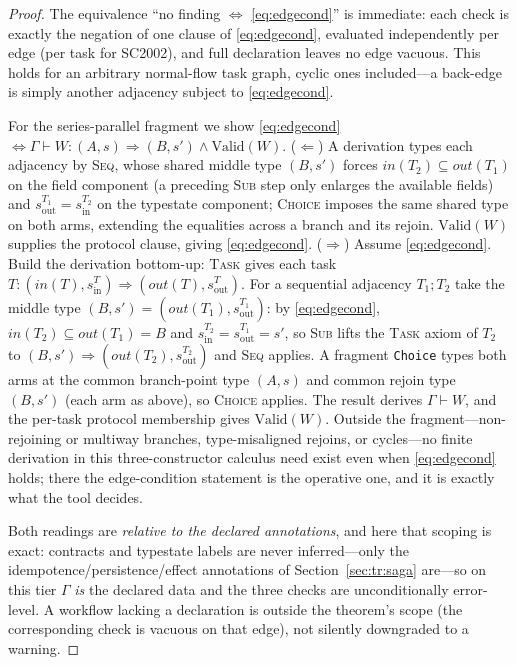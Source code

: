 \documentclass[11pt]{article}
\newcommand{\code}[1]{\textsf{\small #1}}
\theoremstyle{plain}
\theoremstyle{definition}
\theoremstyle{remark}
\begin{document}
\begin{proof}
The equivalence ``no finding $\iff$ \eqref{eq:edgecond}'' is immediate: each check is exactly the
negation of one clause of \eqref{eq:edgecond}, evaluated independently per edge (per task for
\code{SC2002}), and full declaration leaves no edge vacuous. This holds for an arbitrary
normal-flow task graph, cyclic ones included---a back-edge is simply another adjacency subject to
\eqref{eq:edgecond}.

For the series-parallel fragment we show \eqref{eq:edgecond}$\iff\Gamma\vdash
W:(A,s)\Rightarrow(B,s')\wedge\mathrm{Valid}(W)$. ($\Leftarrow$) A derivation types each adjacency
by \textsc{Seq}, whose shared middle type $(B,s')$ forces $\mathit{in}(T_2)\subseteq\mathit{out}(T_1)$
on the field component (a preceding \textsc{Sub} step only enlarges the available fields) and
$s_{\mathrm{out}}^{T_1}=s_{\mathrm{in}}^{T_2}$ on the typestate component; \textsc{Choice} imposes
the same shared type on both arms, extending the equalities across a branch and its rejoin.
$\mathrm{Valid}(W)$ supplies the protocol clause, giving \eqref{eq:edgecond}. ($\Rightarrow$)
Assume \eqref{eq:edgecond}. Build the derivation bottom-up: \textsc{Task} gives each task
$T:(\mathit{in}(T),s_{\mathrm{in}}^T)\Rightarrow(\mathit{out}(T),s_{\mathrm{out}}^T)$. For a
sequential adjacency $T_1;T_2$ take the middle type
$(B,s')=(\mathit{out}(T_1),s_{\mathrm{out}}^{T_1})$: by \eqref{eq:edgecond},
$\mathit{in}(T_2)\subseteq\mathit{out}(T_1)=B$ and $s_{\mathrm{in}}^{T_2}=s_{\mathrm{out}}^{T_1}=s'$,
so \textsc{Sub} lifts the \textsc{Task} axiom of $T_2$ to $(B,s')\Rightarrow(\mathit{out}(T_2),
s_{\mathrm{out}}^{T_2})$ and \textsc{Seq} applies. A fragment \texttt{Choice} types both arms at
the common branch-point type $(A,s)$ and common rejoin type $(B,s')$ (each arm as above), so
\textsc{Choice} applies. The result derives $\Gamma\vdash W$, and the per-task protocol
membership gives $\mathrm{Valid}(W)$. Outside the fragment---non-rejoining or multiway branches,
type-misaligned rejoins, or cycles---no finite derivation in this three-constructor calculus need
exist even when \eqref{eq:edgecond} holds; there the edge-condition statement is the operative
one, and it is exactly what the tool decides.

Both readings are \emph{relative to the declared annotations}, and here that scoping is exact:
contracts and typestate labels are never inferred---only the idempotence/persistence/effect
annotations of Section~\ref{sec:tr:saga} are---so on this tier $\Gamma$ \emph{is} the declared
data and the three checks are unconditionally error-level. A workflow lacking a declaration is
outside the theorem's scope (the corresponding check is vacuous on that edge), not silently
downgraded to a warning.
\end{proof}
\end{document}
